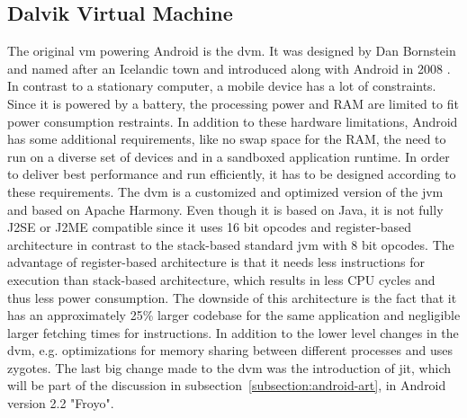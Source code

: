 \subsection{Dalvik Virtual Machine} \label{subsection:android-dalvik}
The original \gls{vm} powering Android is the \gls{dvm}.
It was designed by Dan Bornstein and named after an Icelandic town and introduced along with Android in 2008 \cite{developersRelease}.
\newline
In contrast to a stationary computer, a mobile device has a lot of constraints.
Since it is powered by a battery, the processing power and RAM are limited to fit power consumption restraints.
In addition to these hardware limitations, Android has some additional requirements, like no swap space for the RAM, the need to run on a diverse set of devices and in a sandboxed application runtime.
In order to deliver best performance and run efficiently, it has to be designed according to these requirements.
\newline
The \gls{dvm} is a customized and optimized version of the \gls{jvm} and based on Apache Harmony.
Even though it is based on Java, it is not fully J2SE or J2ME compatible since it uses 16 bit opcodes and register-based architecture in contrast to the stack-based standard \gls{jvm} with 8 bit opcodes.
The advantage of register-based architecture is that it needs less instructions for execution than stack-based architecture, which results in less CPU cycles and thus less power consumption.
The downside of this architecture is the fact that it has an approximately 25\% larger codebase for the same application and negligible larger fetching times for instructions.
In addition to the lower level changes in the \gls{dvm}, e.g. optimizations for memory sharing between different processes \cite{vecShare} and uses zygotes. \cite{ehringerDalvik} \cite{andevconDalvikART}
\newline
The last big change made to the \gls{dvm} was the introduction of \gls{jit}, which will be part of the discussion in subsection~\ref{subsection:android-art}, in Android version 2.2 "Froyo".
